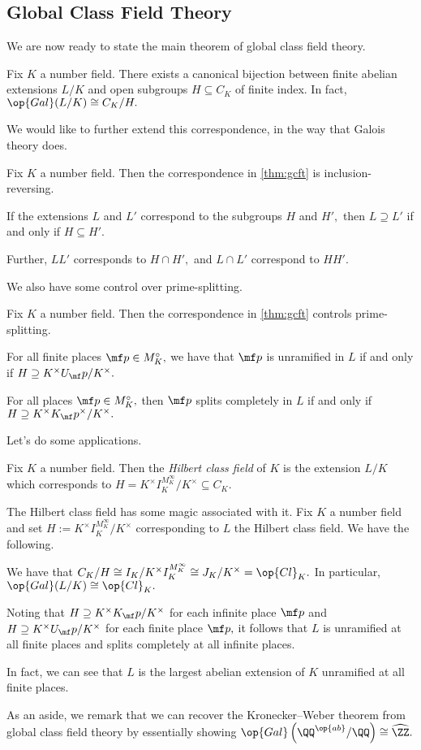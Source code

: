 \documentclass[../notes.tex]{subfiles}
\begin{document}
\subsection{Global Class Field Theory}
We are now ready to state the main theorem of global class field theory.
\begin{theorem} \label{thm:gcft}
	Fix $K$ a number field. There exists a canonical bijection between finite abelian extensions $L/K$ and open subgroups $H\subseteq C_K$ of finite index. In fact, $\op{Gal}(L/K)\cong C_K/H.$
\end{theorem}
We would like to further extend this correspondence, in the way that Galois theory does.
\begin{theorem}
	Fix $K$ a number field. Then the correspondence in \autoref{thm:gcft} is inclusion-reversing.
	\begin{listalph}
		\item If the extensions $L$ and $L'$ correspond to the subgroups $H$ and $H',$ then $L\supseteq L'$ if and only if $H\subseteq H'.$
		\item Further, $LL'$ corresponds to $H\cap H',$ and $L\cap L'$ correspond to $HH'.$
	\end{listalph}
\end{theorem}
We also have some control over prime-splitting.
\begin{theorem}
	Fix $K$ a number field. Then the correspondence in \autoref{thm:gcft} controls prime-splitting.
	\begin{listalph}
		\item For all finite places $\mf p\in M_K^\circ,$ we have that $\mf p$ is unramified in $L$ if and only if $H\supseteq K^\times U_\mf p/K^\times.$
		\item For all places $\mf p\in M_K^\circ,$ then $\mf p$ splits completely in $L$ if and only if $H\supseteq K^\times K_\mf p^\times/K^\times.$ 
	\end{listalph}
\end{theorem}
Let's do some applications.
\begin{definition}
	Fix $K$ a number field. Then the \textit{Hilbert class field} of $K$ is the extension $L/K$ which corresponds to $H=K^\times I_K^{M_K^\infty}/K^\times\subseteq C_K.$
\end{definition}
The Hilbert class field has some magic associated with it. Fix $K$ a number field and set $H:=K^\times I_K^{M_K^\infty}/K^\times$ corresponding to $L$ the Hilbert class field. We have the following.
\begin{listalph}
	\item We have that $C_K/H\cong I_K/K^\times I_K^{M_K^\infty}\cong J_K/K^\times=\op{Cl}_K.$ In particular, $\op{Gal}(L/K)\cong\op{Cl}_K.$
	\item Noting that $H\supseteq K^\times K_\mf p/K^\times$ for each infinite place $\mf p$ and $H\supseteq K^\times U_\mf p/K^\times$ for each finite place $\mf p,$ it follows that $L$ is unramified at all finite places and splits completely at all infinite places.
	\item In fact, we can see that $L$ is the largest abelian extension of $K$ unramified at all finite places.
\end{listalph}
As an aside, we remark that we can recover the Kronecker--Weber theorem from global class field theory by essentially showing $\op{Gal}\left(\QQ^{\op{ab}}/\QQ\right)\cong\widehat{\ZZ}.$
\end{document}
